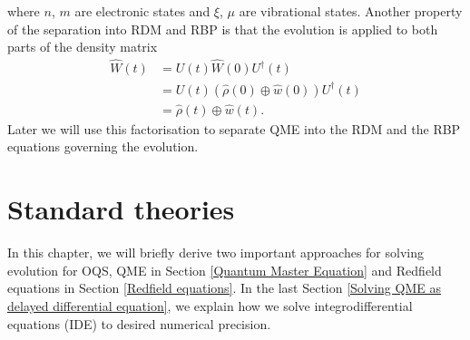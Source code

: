 where $n$, $m$ are electronic states and $\xi$, $\mu$ are vibrational states. 
Another property of the separation into RDM and RBP is that the evolution is applied to both parts of the density matrix
\begin{equation}
    \begin{aligned}
    \hat{W}(t) &=U(t)\hat{W}(0)U^\dagger(t) \\
    &=U(t)(\hat{\rho}(0) \oplus \hat{w}(0))U^\dagger(t) \\
    &=\hat{\rho}(t) \oplus \hat{w}(t).
    \end{aligned}
\end{equation}
Later we will use this factorisation to separate QME into the RDM and the RBP equations governing the evolution.

\chapter{Standard theories}
In this chapter, we will briefly derive two important approaches for solving evolution for OQS, QME in Section \ref{Quantum Master Equation} and Redfield equations in Section \ref{Redfield equations}. In the last Section \ref{Solving QME as delayed differential equation}, we explain how we solve integrodifferential equations (IDE) to desired numerical precision. 

